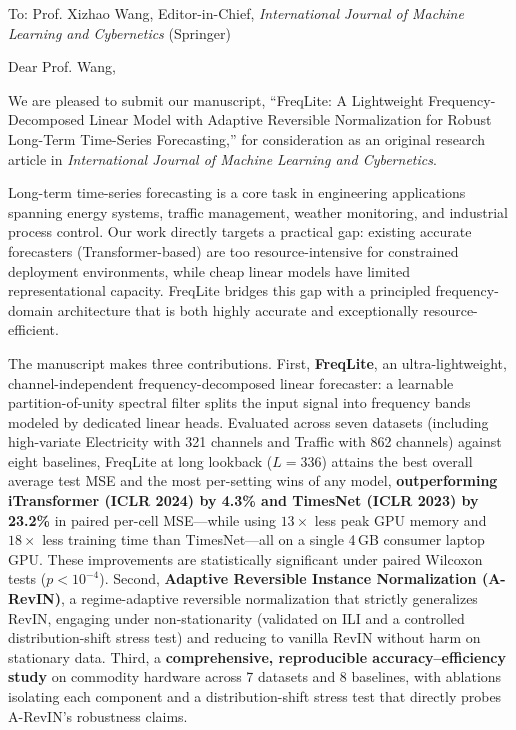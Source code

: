 \documentclass[11pt]{article}
\begin{document}
To: Prof. Xizhao Wang, Editor-in-Chief, \textit{International Journal of
Machine Learning and Cybernetics} (Springer)

Dear Prof. Wang,

We are pleased to submit our manuscript, ``FreqLite: A Lightweight
Frequency-Decomposed Linear Model with Adaptive Reversible Normalization for
Robust Long-Term Time-Series Forecasting,'' for consideration as an original
research article in \textit{International Journal of Machine Learning and
Cybernetics}.

Long-term time-series forecasting is a core task in engineering applications
spanning energy systems, traffic management, weather monitoring, and industrial
process control. Our work directly targets a practical gap: existing accurate
forecasters (Transformer-based) are too resource-intensive for constrained
deployment environments, while cheap linear models have limited representational
capacity. FreqLite bridges this gap with a principled frequency-domain
architecture that is both highly accurate and exceptionally resource-efficient.

The manuscript makes three contributions. First, \textbf{FreqLite}, an
ultra-lightweight, channel-independent frequency-decomposed linear forecaster: a
learnable partition-of-unity spectral filter splits the input signal into
frequency bands modeled by dedicated linear heads. Evaluated across seven
datasets (including high-variate Electricity with 321 channels and Traffic with
862 channels) against eight baselines, FreqLite at long lookback ($L{=}336$)
attains the best overall average test MSE and the most per-setting wins of any
model, \textbf{outperforming iTransformer (ICLR 2024) by 4.3\% and TimesNet
(ICLR 2023) by 23.2\%} in paired per-cell MSE---while using $13\times$ less
peak GPU memory and $18\times$ less training time than TimesNet---all on a
single 4\,GB consumer laptop GPU. These improvements are statistically
significant under paired Wilcoxon tests ($p < 10^{-4}$). Second, \textbf{Adaptive Reversible
Instance Normalization (A-RevIN)}, a regime-adaptive reversible normalization
that strictly generalizes RevIN, engaging under non-stationarity (validated on
ILI and a controlled distribution-shift stress test) and reducing to vanilla
RevIN without harm on stationary data. Third, a \textbf{comprehensive,
reproducible accuracy--efficiency study} on commodity hardware across 7 datasets
and 8 baselines, with ablations isolating each component and a distribution-shift
stress test that directly probes A-RevIN's robustness claims.
\end{document}
